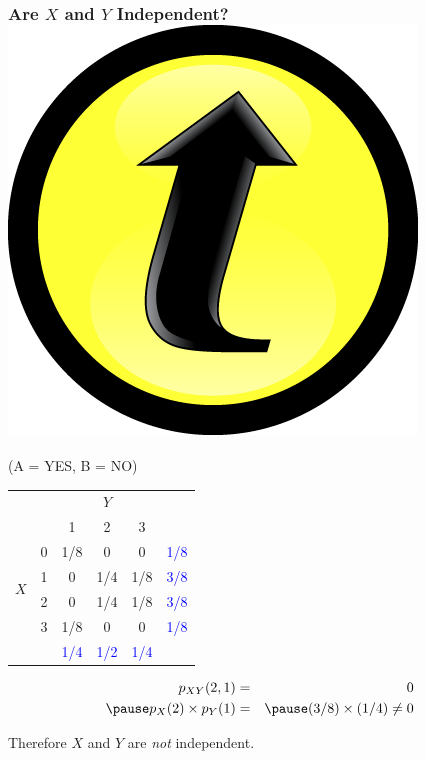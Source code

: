 \documentclass[handout]{beamer}
\begin{document}
\begin{frame}
\frametitle{Are $X$ and $Y$ Independent? \hfill \includegraphics[scale = 0.05]{./images/clicker}}
\alert{(A = YES, B = NO)}
\small
\begin{table}
\begin{tabular}{|cc|ccc|c|}
\hline
&&\multicolumn{3}{c|}{$Y$}&\\
&&1 & 2&3&\\
\hline
\multirow{4}{*}{$X$}
&0& \multicolumn{1}{|c}{\alert{1/8}} & \alert{0}& \alert{0}&\textcolor{blue}{1/8}\\
&1& \multicolumn{1}{|c}{\alert{0}} & \alert{1/4}&\alert{1/8}&\textcolor{blue}{3/8}\\
&2& \multicolumn{1}{|c}{\alert{0}} & \alert{1/4}&\alert{1/8}&\textcolor{blue}{3/8}\\
&3& \multicolumn{1}{|c}{\alert{1/8}} & \alert{0}&\alert{0}&\textcolor{blue}{1/8}\\
\hline
&&\textcolor{blue}{1/4}&\textcolor{blue}{1/2}&\textcolor{blue}{1/4}&\\
\hline
\end{tabular}
\end{table}

\pause

\begin{eqnarray*}
	p_{XY}(2,1) &=& 0\\ \pause
	p_X(2) \times p_Y(1) &=& \pause (3/8) \times (1/4) \neq 0
\end{eqnarray*}

\alert{Therefore $X$ and $Y$ are \emph{not} independent.}
\end{frame}
\end{document}
